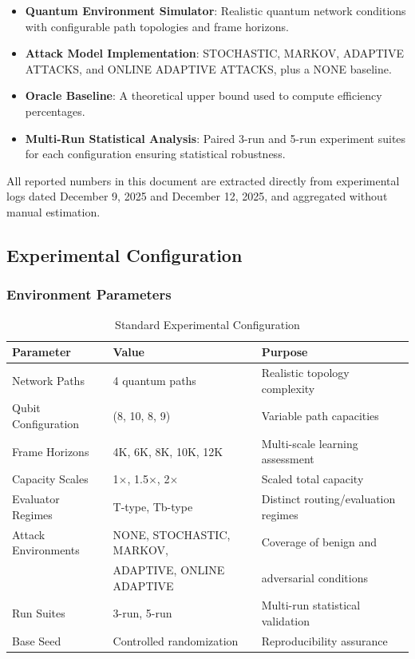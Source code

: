 \documentclass[12pt,a4paper]{article}
\begin{document}
\begin{itemize}
\item \textbf{Quantum Environment Simulator}: Realistic quantum network conditions with configurable path topologies and frame horizons.
\item \textbf{Attack Model Implementation}: STOCHASTIC, MARKOV, ADAPTIVE ATTACKS, and ONLINE ADAPTIVE ATTACKS, plus a NONE baseline.
\item \textbf{Oracle Baseline}: A theoretical upper bound used to compute efficiency percentages.
\item \textbf{Multi-Run Statistical Analysis}: Paired 3-run and 5-run experiment suites for each configuration ensuring statistical robustness.
\end{itemize}

All reported numbers in this document are extracted directly from experimental logs dated December 9, 2025 and December 12, 2025, and aggregated without manual estimation.

\subsection{Experimental Configuration}

\subsubsection{Environment Parameters}

\begin{table}[H]
\centering
\caption{Standard Experimental Configuration}
\begin{tabular}{|l|l|l|}
\hline
\textbf{Parameter} & \textbf{Value} & \textbf{Purpose} \\
\hline
\hline
Network Paths & 4 quantum paths & Realistic topology complexity \\
Qubit Configuration & (8, 10, 8, 9) & Variable path capacities \\
Frame Horizons & 4K, 6K, 8K, 10K, 12K & Multi-scale learning assessment \\
Capacity Scales & 1$\times$, 1.5$\times$, 2$\times$ & Scaled total capacity \\
Evaluator Regimes & T-type, Tb-type & Distinct routing/evaluation regimes \\
Attack Environments & NONE, STOCHASTIC, MARKOV, & Coverage of benign and \\
 & ADAPTIVE, ONLINE ADAPTIVE & adversarial conditions \\
Run Suites & 3-run, 5-run & Multi-run statistical validation \\
Base Seed & Controlled randomization & Reproducibility assurance \\
\hline
\end{tabular}
\end{table}
\end{document}
